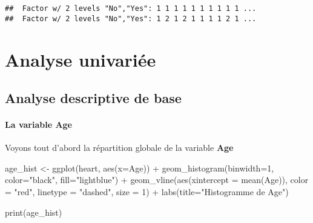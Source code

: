 \documentclass[
]{article}
\newenvironment{Shaded}{\begin{snugshade}}{\end{snugshade}}
\newcommand{\AttributeTok}[1]{\textcolor[rgb]{0.77,0.63,0.00}{#1}}
\newcommand{\DecValTok}[1]{\textcolor[rgb]{0.00,0.00,0.81}{#1}}
\newcommand{\FunctionTok}[1]{\textcolor[rgb]{0.00,0.00,0.00}{#1}}
\newcommand{\NormalTok}[1]{#1}
\newcommand{\OtherTok}[1]{\textcolor[rgb]{0.56,0.35,0.01}{#1}}
\newcommand{\SpecialCharTok}[1]{\textcolor[rgb]{0.00,0.00,0.00}{#1}}
\newcommand{\StringTok}[1]{\textcolor[rgb]{0.31,0.60,0.02}{#1}}
\begin{document}
\begin{Shaded}
\end{Shaded}

\begin{verbatim}
##  Factor w/ 2 levels "No","Yes": 1 1 1 1 1 1 1 1 1 1 ...
##  Factor w/ 2 levels "No","Yes": 1 2 1 2 1 1 1 1 2 1 ...
\end{verbatim}

\hypertarget{analyse-univariuxe9e}{%
\section{Analyse univariée}\label{analyse-univariuxe9e}}

\hypertarget{analyse-descriptive-de-base}{%
\subsection{Analyse descriptive de
base}\label{analyse-descriptive-de-base}}

\hypertarget{la-variable-age}{%
\paragraph{\texorpdfstring{La variable
\textbf{Age}}{La variable Age}}\label{la-variable-age}}

Voyons tout d'abord la répartition globale de la variable \textbf{Age}

\begin{Shaded}
\begin{Highlighting}[]
\NormalTok{age\_hist }\OtherTok{\textless{}{-}} \FunctionTok{ggplot}\NormalTok{(heart, }\FunctionTok{aes}\NormalTok{(}\AttributeTok{x=}\NormalTok{Age)) }\SpecialCharTok{+} 
  \FunctionTok{geom\_histogram}\NormalTok{(}\AttributeTok{binwidth=}\DecValTok{1}\NormalTok{, }\AttributeTok{color=}\StringTok{"black"}\NormalTok{, }\AttributeTok{fill=}\StringTok{"lightblue"}\NormalTok{) }\SpecialCharTok{+}
  \FunctionTok{geom\_vline}\NormalTok{(}\FunctionTok{aes}\NormalTok{(}\AttributeTok{xintercept =} \FunctionTok{mean}\NormalTok{(Age)), }\AttributeTok{color =} \StringTok{"red"}\NormalTok{, }\AttributeTok{linetype =} \StringTok{"dashed"}\NormalTok{, }\AttributeTok{size =} \DecValTok{1}\NormalTok{) }\SpecialCharTok{+}
  \FunctionTok{labs}\NormalTok{(}\AttributeTok{title=}\StringTok{"Histogramme de Age"}\NormalTok{)}

\FunctionTok{print}\NormalTok{(age\_hist)}
\end{Highlighting}
\end{Shaded}
\end{document}
